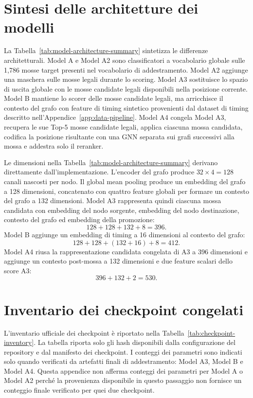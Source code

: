 

\section{Sintesi delle architetture dei modelli}
\label{app:hyperparameters:models}

La Tabella~\ref{tab:model-architecture-summary} sintetizza le differenze architetturali.  Model A e Model A2 sono classificatori a vocabolario globale sulle 1,786 mosse target presenti nel vocabolario di addestramento.  Model A2 aggiunge una maschera sulle mosse legali durante lo scoring.  Model A3 sostituisce lo spazio di uscita globale con le mosse candidate legali disponibili nella posizione corrente.  Model B mantiene lo scorer delle mosse candidate legali, ma arricchisce il contesto del grafo con feature di timing sintetico provenienti dal dataset di timing descritto nell'Appendice~\ref{app:data-pipeline}.  Model A4 congela Model A3, recupera le sue Top-5 mosse candidate legali, applica ciascuna mossa candidata, codifica la posizione risultante con una GNN separata sui grafi successivi alla mossa e addestra solo il reranker.



Le dimensioni nella Tabella~\ref{tab:model-architecture-summary} derivano direttamente dall'implementazione.  L'encoder del grafo produce \(32\times4=128\) canali nascosti per nodo.  Il global mean pooling produce un embedding del grafo a 128 dimensioni, concatenato con quattro feature globali per formare un contesto del grafo a 132 dimensioni.  Model A3 rappresenta quindi ciascuna mossa candidata con embedding del nodo sorgente, embedding del nodo destinazione, contesto del grafo ed embedding della promozione:
\[
128 + 128 + 132 + 8 = 396.
\]
Model B aggiunge un embedding di timing a 16 dimensioni al contesto del grafo:
\[
128 + 128 + (132 + 16) + 8 = 412.
\]
Model A4 riusa la rappresentazione candidata congelata di A3 a 396 dimensioni e aggiunge un contesto post-mossa a 132 dimensioni e due feature scalari dello score A3:
\[
396 + 132 + 2 = 530.
\]

\section{Inventario dei checkpoint congelati}
\label{app:hyperparameters:checkpoints}

L'inventario ufficiale dei checkpoint è riportato nella Tabella~\ref{tab:checkpoint-inventory}.  La tabella riporta solo gli hash disponibili dalla configurazione del repository e dal manifesto dei checkpoint.  I conteggi dei parametri sono indicati solo quando verificati da artefatti finali di addestramento: Model A3, Model B e Model A4.  Questa appendice non afferma conteggi dei parametri per Model A o Model A2 perché la provenienza disponibile in questo passaggio non fornisce un conteggio finale verificato per quei due checkpoint.

